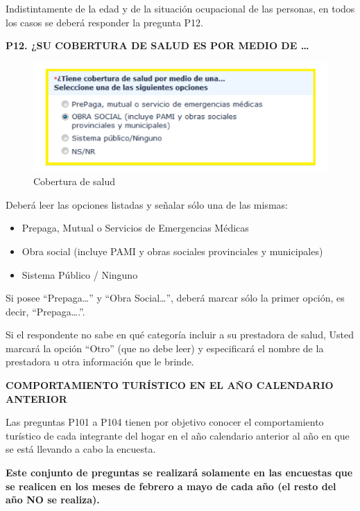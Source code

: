 \documentclass[
  openany]{book}
\begin{document}
Indistintamente de la edad y de la situación ocupacional de las personas, en todos los casos se deberá responder la pregunta P12.

\textbf{P12. ¿SU COBERTURA DE SALUD ES POR MEDIO DE \ldots{}}

\begin{figure}

{\centering \includegraphics[width=1\linewidth]{imagenes/figura6-59} 

}

\caption{Cobertura de salud}\label{fig:coberturasalud}
\end{figure}

Deberá leer las opciones listadas y señalar sólo una de las mismas:

\begin{itemize}
\item
  Prepaga, Mutual o Servicios de Emergencias Médicas
\item
  Obra social (incluye PAMI y obras sociales provinciales y municipales)
\item
  Sistema Público / Ninguno
\end{itemize}

Si posee ``Prepaga\ldots{}'' y ``Obra Social\ldots{}'', deberá marcar sólo la primer opción, es decir, ``Prepaga\ldots.''.

Si el respondente no sabe en qué categoría incluir a su prestadora de salud, Usted marcará la opción ``Otro'' (que no debe leer) y especificará el nombre de la prestadora u otra información que le brinde.

\textbf{COMPORTAMIENTO TURÍSTICO EN EL AÑO CALENDARIO ANTERIOR}

Las preguntas P101 a P104 tienen por objetivo conocer el comportamiento turístico de cada integrante del hogar en el año calendario anterior al año en que se está llevando a cabo la encuesta.

\textbf{Este conjunto de preguntas se realizará solamente en las encuestas que se realicen en los meses de febrero a mayo de cada año (el resto del año NO se realiza).}
\end{document}
